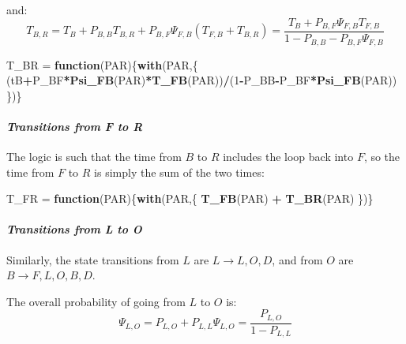 \documentclass[]{article}
\newenvironment{Shaded}{\begin{snugshade}}{\end{snugshade}}
\newcommand{\ControlFlowTok}[1]{\textcolor[rgb]{0.13,0.29,0.53}{\textbf{#1}}}
\newcommand{\DecValTok}[1]{\textcolor[rgb]{0.00,0.00,0.81}{#1}}
\newcommand{\KeywordTok}[1]{\textcolor[rgb]{0.13,0.29,0.53}{\textbf{#1}}}
\newcommand{\NormalTok}[1]{#1}
\newcommand{\OperatorTok}[1]{\textcolor[rgb]{0.81,0.36,0.00}{\textbf{#1}}}
\newcommand{\StringTok}[1]{\textcolor[rgb]{0.31,0.60,0.02}{#1}}
\let\oldparagraph\paragraph
\renewcommand{\paragraph}[1]{\oldparagraph{#1}\mbox{}}
\begin{document}
and: \[ 
T_{B,R} = T_B + P_{B,B} T_{B,R} + P_{B,F} \Psi_{F,B} \left(T_{F,B} +  T_{B,R} \right) =  \frac{T_B +  P_{B,F} \Psi_{F,B} T_{F,B}}{1-P_{B,B} - P_{B,F} \Psi_{F,B}}
\]

\begin{Shaded}
\begin{Highlighting}[]
\NormalTok{T_BR =}\StringTok{ }\ControlFlowTok{function}\NormalTok{(PAR)\{}\KeywordTok{with}\NormalTok{(PAR,\{}
\NormalTok{  (tB}\OperatorTok{+}\NormalTok{P_BF}\OperatorTok{*}\KeywordTok{Psi_FB}\NormalTok{(PAR)}\OperatorTok{*}\KeywordTok{T_FB}\NormalTok{(PAR))}\OperatorTok{/}\NormalTok{(}\DecValTok{1}\OperatorTok{-}\NormalTok{P_BB}\OperatorTok{-}\NormalTok{P_BF}\OperatorTok{*}\KeywordTok{Psi_FB}\NormalTok{(PAR))}
\NormalTok{\})\}}
\end{Highlighting}
\end{Shaded}

\hypertarget{transitions-from-f-to-r}{%
\paragraph{\texorpdfstring{\emph{Transitions from F to
R}}{Transitions from F to R}}\label{transitions-from-f-to-r}}

The logic is such that the time from \(B\) to \(R\) includes the loop
back into \(F\), so the time from \(F\) to \(R\) is simply the sum of
the two times:

\begin{Shaded}
\begin{Highlighting}[]
\NormalTok{T_FR =}\StringTok{ }\ControlFlowTok{function}\NormalTok{(PAR)\{}\KeywordTok{with}\NormalTok{(PAR,\{}
  \KeywordTok{T_FB}\NormalTok{(PAR) }\OperatorTok{+}\StringTok{ }\KeywordTok{T_BR}\NormalTok{(PAR)}
\NormalTok{\})\}}
\end{Highlighting}
\end{Shaded}

\hypertarget{transitions-from-l-to-o}{%
\paragraph{\texorpdfstring{\emph{Transitions from L to
O}}{Transitions from L to O}}\label{transitions-from-l-to-o}}

Similarly, the state transitions from \(L\) are
\(L \rightarrow {L,O,D}\), and from \(O\) are
\(B\rightarrow {F,L,O,B,D}\).

The overall probability of going from \(L\) to \(O\) is: \[
\Psi_{L,O}= P_{L,O} + P_{L,L} \Psi_{L,O} = \frac{P_{L,O}}{1-P_{L,L}}
\]
\end{document}
